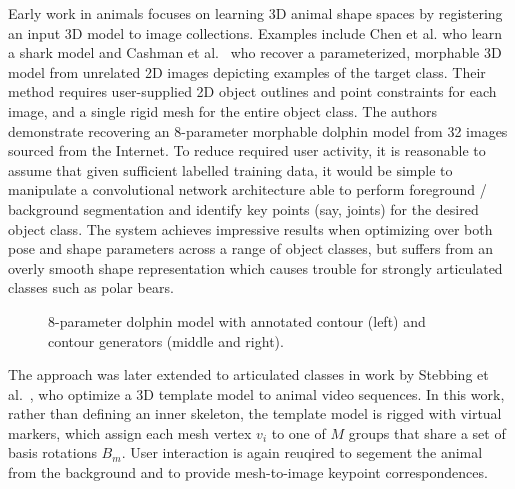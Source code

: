     Early work in animals focuses on learning 3D animal shape spaces by registering an input 3D model to image collections. Examples include Chen et al. who learn a shark model and Cashman et al.~\cite{cashman2013shape} who recover a parameterized, morphable 3D model from unrelated 2D images depicting examples of the target class. Their method requires user-supplied 2D object outlines and point constraints for each image, and a single rigid mesh for the entire object class. The authors demonstrate recovering an 8-parameter morphable dolphin model from 32 images sourced from the Internet. To reduce required user activity, it is reasonable to assume that given sufficient labelled training data, it would be simple to manipulate a convolutional network architecture able to perform foreground / background segmentation and identify key points (say, joints) for the desired object class. The system achieves impressive results when optimizing over both pose and shape parameters across a range of object classes, but suffers from an overly smooth shape representation which causes trouble for strongly articulated classes such as polar bears.

    \begin{figure}[H] %
        \caption{8-parameter dolphin model with annotated contour (left) and contour generators (middle and right).}
        \label{fig:cashman_fitzgibbon}
    \end{figure}


    The approach was later extended to articulated classes in work by Stebbing et al.~\cite{arap_stebbing}, who optimize a 3D template model to animal video sequences. In this work, rather than defining an inner skeleton, the template model is rigged with virtual markers, which assign each mesh vertex $v_i$ to one of $M$ groups that share a set of basis rotations $B_{m}$. User interaction is again reuqired to segement the animal from the background and to provide mesh-to-image keypoint correspondences.


